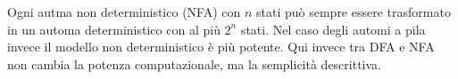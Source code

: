 \documentclass[12pt]{report}
\begin{document}
Ogni autma non deterministico (NFA) con $n$ stati può sempre essere trasformato in un automa deterministico con al più $2^n$ stati.
Nel caso degli automi a pila invece il modello non deterministico è più potente.
Qui invece tra DFA e NFA non cambia la potenza computazionale, ma la semplicità descrittiva.
\end{document}
